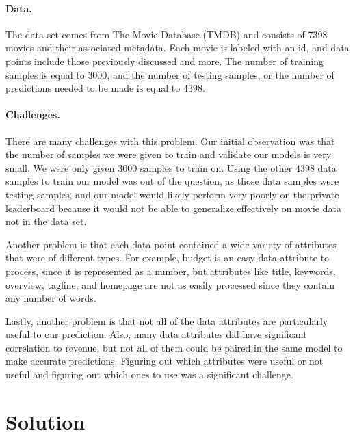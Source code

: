 \documentclass[11pt]{article}
\numberwithin{equation}{section}
\begin{document}
\paragraph{Data.} 
The data set comes from The Movie Database (TMDB) and consists of 7398 movies and their associated metadata. Each movie is labeled with an id, and data points include those previously discussed and more. The number of training samples is equal to $3000$, and the number of testing samples, or the number of predictions needed to be made is equal to $4398$.

\paragraph{Challenges.}
There are many challenges with this problem. Our initial observation was that the number of samples we were given to train and validate our models is very small. We were only given 3000 samples to train on. Using the other 4398 data samples to train our model was out of the question, as those data samples were testing samples, and our model would likely perform very poorly on the private leaderboard because it would not be able to generalize effectively on movie data not in the data set. 

Another problem is that each data point contained a wide variety of attributes that were of different types. For example, budget is an easy data attribute to process, since it is represented as a number, but attributes like title, keywords, overview, tagline, and homepage are not as easily processed since they contain any number of words.

Lastly, another problem is that not all of the data attributes are particularly useful to our prediction. Also, many data attributes did have significant correlation to revenue, but not all of them could be paired in the same model to make accurate predictions. Figuring out which attributes were useful or not useful and figuring out which ones to use was a significant challenge. 

\section{Solution}
\end{document}
